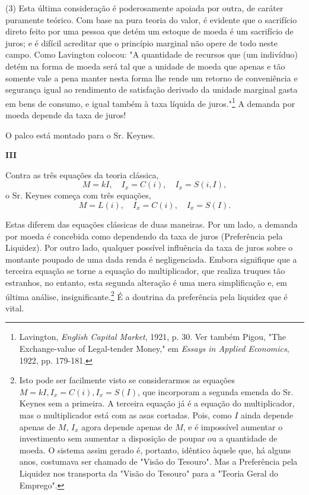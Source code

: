 \documentclass[12pt]{article}
\begin{document}
(3) Esta última consideração é poderosamente apoiada por outra, de caráter puramente teórico. Com base na pura teoria do valor, é evidente que o sacrifício direto feito por uma pessoa que detém um estoque de moeda é um sacrifício de juros; e é difícil acreditar que o princípio marginal não opere de todo neste campo. Como Lavington colocou: "A quantidade de recursos que (um indivíduo) detém na forma de moeda será tal que a unidade de moeda que apenas e tão somente vale a pena manter nesta forma lhe rende um retorno de conveniência e segurança igual ao rendimento de satisfação derivado da unidade marginal gasta em bens de consumo, e igual também à taxa líquida de juros."\footnote{Lavington, \textit{English Capital Market}, 1921, p. 30. Ver também Pigou, "The Exchange-value of Legal-tender Money," em \textit{Essays in Applied Economics}, 1922, pp. 179-181.} A demanda por moeda depende da taxa de juros!

O palco está montado para o Sr. Keynes.

\begin{center}
\textbf{III}
\end{center}

Contra as três equações da teoria clássica,
\[ M = kI, \quad I_x = C(i), \quad I_x = S(i, I), \]
o Sr. Keynes começa com três equações,
\[ M = L(i), \quad I_x = C(i), \quad I_x = S(I). \]

Estas diferem das equações clássicas de duas maneiras. Por um lado, a demanda por moeda é concebida como dependendo da taxa de juros (Preferência pela Liquidez). Por outro lado, qualquer possível influência da taxa de juros sobre o montante poupado de uma dada renda é negligenciada. Embora signifique que a terceira equação se torne a equação do multiplicador, que realiza truques tão estranhos, no entanto, esta segunda alteração é uma mera simplificação e, em última análise, insignificante.\footnote{Isto pode ser facilmente visto se considerarmos as equações $M = kI, I_x = C(i), I_x = S(I)$, que incorporam a segunda emenda do Sr. Keynes sem a primeira. A terceira equação já é a equação do multiplicador, mas o multiplicador está com as asas cortadas. Pois, como $I$ ainda depende apenas de $M$, $I_x$ agora depende apenas de $M$, e é impossível aumentar o investimento sem aumentar a disposição de poupar ou a quantidade de moeda. O sistema assim gerado é, portanto, idêntico àquele que, há alguns anos, costumava ser chamado de "Visão do Tesouro". Mas a Preferência pela Liquidez nos transporta da "Visão do Tesouro" para a "Teoria Geral do Emprego".} É a doutrina da preferência pela liquidez que é vital.
\end{document}
